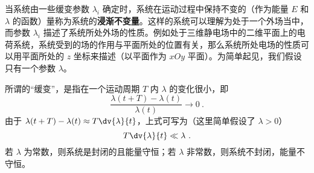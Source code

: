 
\begin{issues}
\issueTODO
\end{issues}

当系统由一些缓变参数 $\lambda_i$ 确定时，系统在运动过程中保持不变的（作为能量 $E$ 和 $\lambda$ 的函数）量称为系统的\textbf{浸渐不变量}。这样的系统可以理解为处于一个外场当中，而参数 $\lambda_i$ 描述了系统所处外场的性质。例如处于三维静电场中的二维平面上的电荷系统，系统受到的场的作用与平面所处的位置有关，那么系统所处电场的性质可以用平面所处的 $z$ 坐标来描述（以平面作为 $xOy$ 平面）。为简单起见，我们假设只有一个参数 $\lambda$。

所谓的“缓变”，是指在一个运动周期 $T$ 内 $\lambda$ 的变化很小，即 
\begin{equation}\label{eq_ConAdi_4}
\frac{\lambda(t+T)-\lambda(t)}{\lambda(t)}\rightarrow0~.
\end{equation}
由于 $\lambda(t+T)-\lambda(t)\approx T\dv{\lambda}{t}$，上式可写为（这里简单假设了 $\lambda>0$）
\begin{equation}
T\dv{\lambda}{t}\ll\lambda~.
\end{equation}
若 $\lambda$ 为常数，则系统是封闭的且能量守恒；若 $\lambda$ 非常数，则系统不封闭，能量不守恒。
